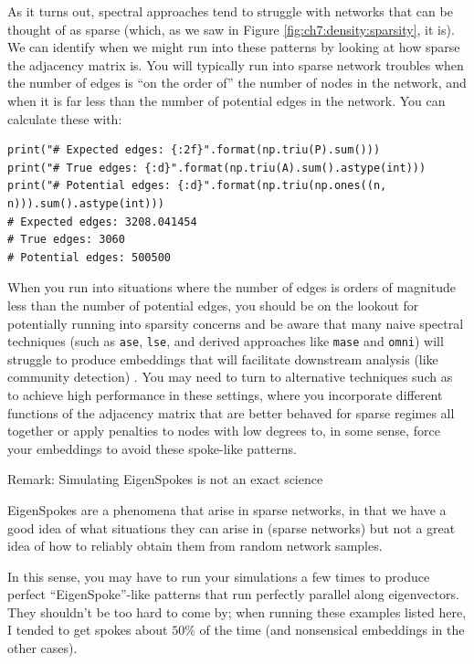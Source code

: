 As it turns out, spectral approaches tend to struggle with networks that can be thought of as sparse (which, as we saw in Figure \ref{fig:ch7:density:sparsity}, it is). We can identify when we might run into these patterns by looking at how sparse the adjacency matrix is. You will typically run into sparse network troubles when the number of edges is ``on the order of'' the number of nodes in the network, and when it is far less than the number of potential edges in the network. You can calculate these with:

\begin{lstlisting}[style=python]
print("# Expected edges: {:2f}".format(np.triu(P).sum()))
print("# True edges: {:d}".format(np.triu(A).sum().astype(int)))
print("# Potential edges: {:d}".format(np.triu(np.ones((n, n))).sum().astype(int)))
# Expected edges: 3208.041454
# True edges: 3060
# Potential edges: 500500
\end{lstlisting}

When you run into situations where the number of edges is orders of magnitude less than the number of potential edges, you should be on the lookout for potentially running into sparsity concerns and be aware that many naive spectral techniques (such as \texttt{ase}, \texttt{lse}, and derived approaches like \texttt{mase} and \texttt{omni}) will struggle to produce embeddings that will facilitate downstream analysis (like community detection) \cite{Lei2013Dec}. You may need to turn to alternative techniques such as \cite{Krzakala2013Dec,Chen2012} to achieve high performance in these settings, where you incorporate different functions of the adjacency matrix that are better behaved for sparse regimes all together or apply penalties to nodes with low degrees to, in some sense, force your embeddings to avoid these spoke-like patterns.

\begin{floatingbox}[h]\caption{Remark: Simulating EigenSpokes is not an exact science}
EigenSpokes are a phenomena that arise in sparse networks, in that we have a good idea of what situations they can arise in (sparse networks) but not a great idea of how to reliably obtain them from random network samples. 

In this sense, you may have to run your simulations a few times to produce perfect ``EigenSpoke''-like patterns that run perfectly parallel along eigenvectors. They shouldn't be too hard to come by; when running these examples listed here, I tended to get spokes about $50\%$ of the time (and nonsensical embeddings in the other cases). 
\end{floatingbox}

